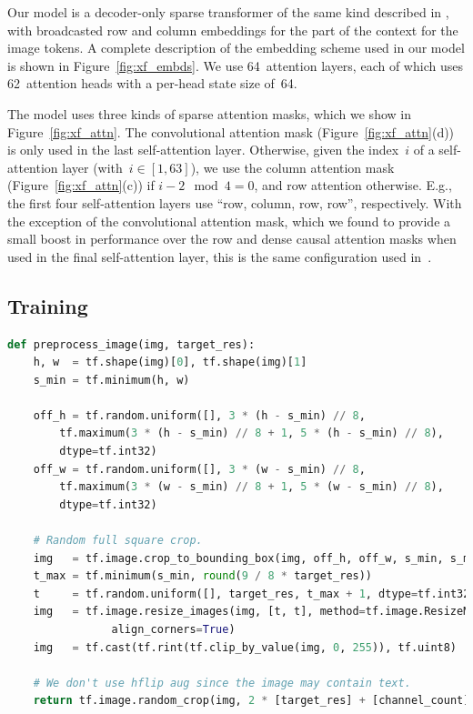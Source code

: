 \documentclass{article}
\begin{document}
%
Our model is a decoder-only sparse transformer of the same kind described in \citet{child2019generating}, with broadcasted row and column embeddings for the part of the context for the image tokens. A complete description of the embedding scheme used in our model is shown in Figure~\ref{fig:xf_embds}. We use 64~attention layers, each of which uses 62~attention heads with a per-head state size of~64.

The model uses three kinds of sparse attention masks, which we show in Figure~\ref{fig:xf_attn}. The convolutional attention mask (Figure~\ref{fig:xf_attn}(d)) is only used in the last self-attention layer. Otherwise, given the index~$i$ of a self-attention layer (with~$i \in [1, 63]$), we use the column attention mask (Figure~\ref{fig:xf_attn}(c)) if $i - 2 \!\!\mod 4 = 0$, and row attention otherwise. E.g., the first four self-attention layers use ``row, column, row, row'', respectively. With the exception of the convolutional attention mask, which we found to provide a small boost in performance over the row and dense causal attention masks when used in the final self-attention layer, this is the same configuration used in~\citet{child2019generating}.

\subsection{Training}
\label{sec:xf_train}
%
\begin{lstlisting}[language=Python,basicstyle=\footnotesize\ttfamily,caption={TensorFlow~\cite{abadi2016tensorflow} image preprocessing code for training the transformer. We use \texttt{target\_res = 256} and \texttt{channel\_count = 3}.},label={lst:xf_preproc},captionpos=b,float=tp,floatplacement=tbp]
def preprocess_image(img, target_res):
    h, w  = tf.shape(img)[0], tf.shape(img)[1]
    s_min = tf.minimum(h, w)

    off_h = tf.random.uniform([], 3 * (h - s_min) // 8,
        tf.maximum(3 * (h - s_min) // 8 + 1, 5 * (h - s_min) // 8),
        dtype=tf.int32)
    off_w = tf.random.uniform([], 3 * (w - s_min) // 8,
        tf.maximum(3 * (w - s_min) // 8 + 1, 5 * (w - s_min) // 8),
        dtype=tf.int32)

    # Random full square crop.
    img   = tf.image.crop_to_bounding_box(img, off_h, off_w, s_min, s_min)
    t_max = tf.minimum(s_min, round(9 / 8 * target_res))
    t     = tf.random.uniform([], target_res, t_max + 1, dtype=tf.int32)
    img   = tf.image.resize_images(img, [t, t], method=tf.image.ResizeMethod.AREA,
                align_corners=True)
    img   = tf.cast(tf.rint(tf.clip_by_value(img, 0, 255)), tf.uint8)

    # We don't use hflip aug since the image may contain text.
    return tf.image.random_crop(img, 2 * [target_res] + [channel_count])
\end{lstlisting}
\end{document}
